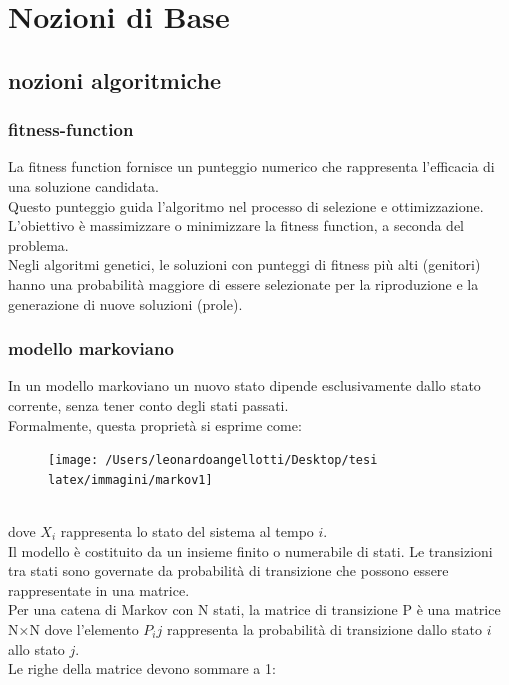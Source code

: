 \documentclass[a4paper,12pt]{report}
\begin{document}
\chapter{Nozioni di Base}

\section{nozioni algoritmiche}

\subsection{fitness-function}

La fitness function fornisce un punteggio numerico che rappresenta l'efficacia di una soluzione candidata. \\
Questo punteggio guida l'algoritmo nel processo di selezione e ottimizzazione. \\
L'obiettivo è massimizzare o minimizzare la fitness function, a seconda del problema. \\
Negli algoritmi genetici, le soluzioni con punteggi di fitness più alti (genitori) hanno una probabilità maggiore di essere selezionate per la riproduzione e la generazione di nuove soluzioni (prole).

\subsection{modello markoviano}

In un modello markoviano un nuovo stato dipende esclusivamente dallo stato corrente, senza tener conto degli stati passati. \\
Formalmente, questa proprietà si esprime come: 

\begin{figure}[H]
    \centering
    \texttt{[image: /Users/leonardoangellotti/Desktop/tesi latex/immagini/markov1]} 
    \label{fig:immagine}
\end{figure}
\\
dove $X_i$ rappresenta lo stato del sistema al tempo $i$. \\
Il modello è costituito da un insieme finito o numerabile di stati. Le transizioni tra stati sono governate da probabilità di transizione che possono essere rappresentate in una matrice. \\
Per una catena di Markov con N stati, la matrice di transizione P è una matrice N×N dove l'elemento $P_ij$ rappresenta la probabilità di transizione dallo stato $i$ allo stato $j$. \\
Le righe della matrice devono sommare a 1: 
\end{document}
